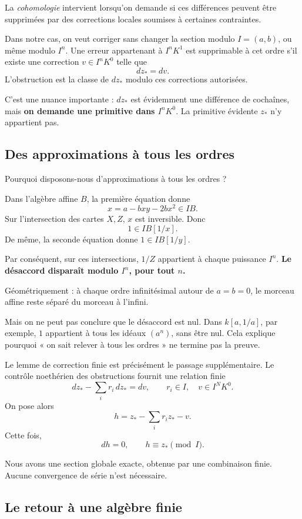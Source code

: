 \documentclass[11pt,a4paper]{article}
\begin{document}
La \emph{cohomologie} intervient lorsqu'on demande si ces différences
peuvent être supprimées par des corrections locales soumises à certaines
contraintes.

Dans notre cas, on veut corriger sans changer la section modulo
$I=(a,b)$, ou même modulo $I^n$. Une erreur appartenant à $I^nK^1$ est
supprimable à cet ordre s'il existe une correction $v\in I^nK^0$ telle que
\[
 dz_*=dv.
\]
L'obstruction est la classe de $dz_*$ modulo ces corrections autorisées.

C'est une nuance importante : $dz_*$ est évidemment une différence de
cochaînes, mais \textbf{on demande une primitive dans $I^nK^0$}.
La primitive évidente $z_*$ n'y appartient pas.

\subsection*{Des approximations à tous les ordres}

Pourquoi disposons-nous d'approximations à tous les ordres ?

Dans l'algèbre affine $B$, la première équation donne
\[
 x=a-bxy-2bx^2\in IB.
\]
Sur l'intersection des cartes $X,Z$, $x$ est inversible. Donc
\[
 1\in I B[1/x].
\]
De même, la seconde équation donne $1\in I B[1/y]$.

Par conséquent, sur ces intersections, $1/Z$ appartient à chaque
puissance $I^n$. \textbf{Le désaccord disparaît modulo $I^n$, pour tout
$n$.}

Géométriquement : à chaque ordre infinitésimal autour de $a=b=0$, le
morceau affine reste séparé du morceau à l'infini.

Mais on ne peut pas conclure que le désaccord est nul. Dans $k[a,1/a]$,
par exemple, $1$ appartient à tous les idéaux $(a^n)$, sans être nul.
Cela explique pourquoi « on sait relever à tous les ordres » ne termine
pas la preuve.

Le lemme de correction finie est précisément le passage supplémentaire.
Le contrôle noethérien des obstructions fournit une relation finie
\[
 dz_*-\sum_i r_i\,dz_*=dv,
 \qquad r_i\in I,\quad v\in I^NK^0.
\]
On pose alors
\[
 h=z_*-\sum_i r_i z_*-v.
\]
Cette fois,
\[
 dh=0,\qquad h\equiv z_*\pmod I.
\]

Nous avons une section globale exacte, obtenue par une combinaison
finie. Aucune convergence de série n'est nécessaire.

\subsection*{Le retour à une algèbre finie}
\end{document}
